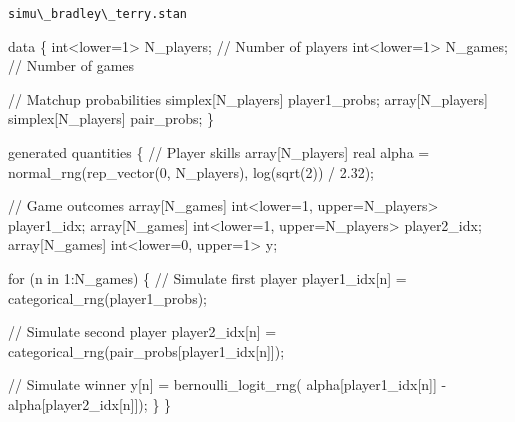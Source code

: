 \documentclass[
  letterpaper,
  DIV=11,
  numbers=noendperiod]{scrartcl}
\newenvironment{Shaded}{\begin{snugshade}}{\end{snugshade}}
\newcommand{\CommentTok}[1]{\textcolor[rgb]{0.37,0.37,0.37}{#1}}
\newcommand{\ControlFlowTok}[1]{\textcolor[rgb]{0.00,0.23,0.31}{#1}}
\newcommand{\DataTypeTok}[1]{\textcolor[rgb]{0.68,0.00,0.00}{#1}}
\newcommand{\DecValTok}[1]{\textcolor[rgb]{0.68,0.00,0.00}{#1}}
\newcommand{\FloatTok}[1]{\textcolor[rgb]{0.68,0.00,0.00}{#1}}
\newcommand{\KeywordTok}[1]{\textcolor[rgb]{0.00,0.23,0.31}{#1}}
\newcommand{\NormalTok}[1]{\textcolor[rgb]{0.00,0.23,0.31}{#1}}
\begin{document}
\begin{codelisting}

\caption{\texttt{simu\textbackslash\_bradley\textbackslash\_terry.stan}}

\begin{Shaded}
\begin{Highlighting}[]
\KeywordTok{data}\NormalTok{ \{}
  \DataTypeTok{int}\NormalTok{\textless{}}\KeywordTok{lower}\NormalTok{=}\DecValTok{1}\NormalTok{\textgreater{} N\_players; }\CommentTok{// Number of players}
  \DataTypeTok{int}\NormalTok{\textless{}}\KeywordTok{lower}\NormalTok{=}\DecValTok{1}\NormalTok{\textgreater{} N\_games;   }\CommentTok{// Number of games}

  \CommentTok{// Matchup probabilities}
  \DataTypeTok{simplex}\NormalTok{[N\_players] player1\_probs;}
  \DataTypeTok{array}\NormalTok{[N\_players] }\DataTypeTok{simplex}\NormalTok{[N\_players] pair\_probs;}
\NormalTok{\}}

\KeywordTok{generated quantities}\NormalTok{ \{}
  \CommentTok{// Player skills}
  \DataTypeTok{array}\NormalTok{[N\_players] }\DataTypeTok{real}\NormalTok{ alpha}
\NormalTok{    = normal\_rng(rep\_vector(}\DecValTok{0}\NormalTok{, N\_players), log(sqrt(}\DecValTok{2}\NormalTok{)) / }\FloatTok{2.32}\NormalTok{);}

  \CommentTok{// Game outcomes}
  \DataTypeTok{array}\NormalTok{[N\_games] }\DataTypeTok{int}\NormalTok{\textless{}}\KeywordTok{lower}\NormalTok{=}\DecValTok{1}\NormalTok{, }\KeywordTok{upper}\NormalTok{=N\_players\textgreater{} player1\_idx;}
  \DataTypeTok{array}\NormalTok{[N\_games] }\DataTypeTok{int}\NormalTok{\textless{}}\KeywordTok{lower}\NormalTok{=}\DecValTok{1}\NormalTok{, }\KeywordTok{upper}\NormalTok{=N\_players\textgreater{} player2\_idx;}
  \DataTypeTok{array}\NormalTok{[N\_games] }\DataTypeTok{int}\NormalTok{\textless{}}\KeywordTok{lower}\NormalTok{=}\DecValTok{0}\NormalTok{, }\KeywordTok{upper}\NormalTok{=}\DecValTok{1}\NormalTok{\textgreater{} y;}

  \ControlFlowTok{for}\NormalTok{ (n }\ControlFlowTok{in} \DecValTok{1}\NormalTok{:N\_games) \{}
    \CommentTok{// Simulate first player}
\NormalTok{    player1\_idx[n] = categorical\_rng(player1\_probs);}

    \CommentTok{// Simulate second player}
\NormalTok{    player2\_idx[n] = categorical\_rng(pair\_probs[player1\_idx[n]]);}

    \CommentTok{// Simulate winner}
\NormalTok{    y[n] = bernoulli\_logit\_rng(  alpha[player1\_idx[n]]}
\NormalTok{                               {-} alpha[player2\_idx[n]]);}
\NormalTok{  \}}
\NormalTok{\}}
\end{Highlighting}
\end{Shaded}

\end{codelisting}
\end{document}
